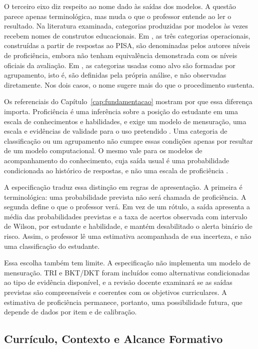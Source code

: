 O terceiro eixo diz respeito ao nome dado às saídas dos modelos. A questão parece apenas terminológica, mas muda o que o professor entende ao ler o resultado. Na literatura examinada, categorias produzidas por modelos às vezes recebem nomes de construtos educacionais. Em , as três categorias operacionais, construídas a partir de respostas ao PISA, são denominadas pelos autores níveis de proficiência, embora não tenham equivalência demonstrada com os níveis oficiais da avaliação. Em , as categorias usadas como alvo são formadas por agrupamento, isto é, são definidas pela própria análise, e não observadas diretamente. Nos dois casos, o nome sugere mais do que o procedimento sustenta.

Os referenciais do Capítulo~\ref{cap:fundamentacao} mostram por que essa diferença importa. Proficiência é uma inferência sobre a posição do estudante em uma escala de conhecimentos e habilidades, e exige um modelo de mensuração, uma escala e evidências de validade para o uso pretendido \cite{NRC2001,OECDPISA2022Framework}. Uma categoria de classificação ou um agrupamento não cumpre essas condições apenas por resultar de um modelo computacional. O mesmo vale para os modelos de acompanhamento do conhecimento, cuja saída usual é uma probabilidade condicionada ao histórico de respostas, e não uma escala de proficiência \cite{Abdelrahman2023}.

A especificação traduz essa distinção em regras de apresentação. A primeira é terminológica: uma probabilidade prevista não será chamada de proficiência. A segunda define o que o professor verá. Em vez de um rótulo, a saída apresenta a média das probabilidades previstas e a taxa de acertos observada com intervalo de Wilson, por estudante e habilidade, e mantém desabilitado o alerta binário de risco. Assim, o professor lê uma estimativa acompanhada de sua incerteza, e não uma classificação do estudante.

Essa escolha também tem limite. A especificação não implementa um modelo de mensuração. TRI e BKT/DKT foram incluídos como alternativas condicionadas ao tipo de evidência disponível, e a revisão docente examinará se as saídas previstas são compreensíveis e coerentes com os objetivos curriculares. A estimativa de proficiência permanece, portanto, uma possibilidade futura, que depende de dados por item e de calibração.

\subsection{Currículo, Contexto e Alcance Formativo}

